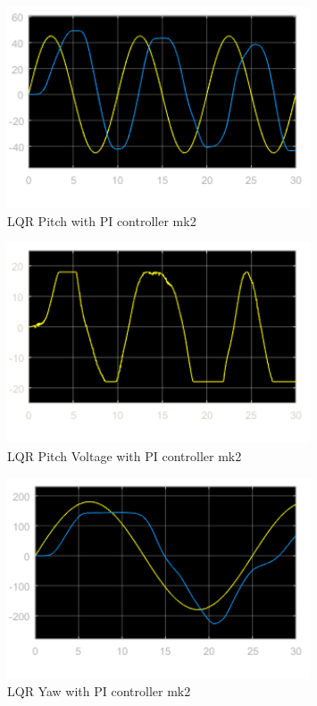 \documentclass[fontsize=11pt, %
                             paper=letter, %
                             openany, %
                             captions=tableheading,
                             index=totoc,
                             hyperref]{labbook}
\begin{document}
\begin{addmargin}[0cm]{0cm}
\begin{figure}[H]
  \centering
  \includegraphics[width=0.8\textwidth]{figs/img/02192019/LQRPitchmk2.png}
  \caption{LQR Pitch with PI controller mk2}
  \label{fig:LQR_PI_Pitchmk2}
\end{figure}

\begin{figure}[H]
  \centering
  \includegraphics[width=0.8\textwidth]{figs/img/02192019/LQRPitchVoltmk2.png}
  \caption{LQR Pitch Voltage with PI controller mk2}
  \label{fig:LQR_PI_PitchVoltmk2}
\end{figure}

\begin{figure}[H]
  \centering
  \includegraphics[width=0.8\textwidth]{figs/img/02192019/LQRYawmk2.png}
  \caption{LQR Yaw with PI controller mk2}
  \label{fig:LQR_PI_Pitchmk2}
\end{figure}


\end{addmargin}
\end{document}

